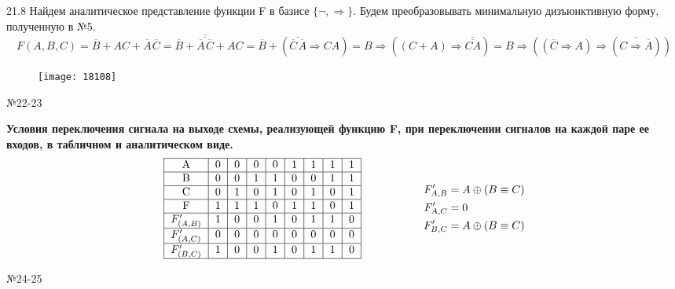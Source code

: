 \documentclass[]{article}
\begin{document}
	21.8 Найдем аналитическое представление функции F в базисе $\{\neg,\Rightarrow\}$.
	Будем преобразовывать минимальную дизъюнктивную форму, полученную в №5.
	\[
		F(A,B,C)=\overline{B} + AC + \overline{A}\hspace{1pt}\overline{C}=
		\overline{B} + \overline{\overline{\overline{A}\hspace{1pt}\overline{C}}}+ AC=
		\overline{B}+(\overline{\overline{C}\hspace{1pt}\overline{A}}\Rightarrow CA)=
		B\Rightarrow((C+A)\Rightarrow \overline{\overline{CA}})=B\Rightarrow((\overline{C}\Rightarrow A)\Rightarrow (\overline{C\Rightarrow\overline{A}}))
	\]
	\begin{figure}[h!]
		\centering
		\texttt{[image: 18108]}
	\end{figure}
	\newpage
	\begin{center}\begin{large}{№22-23}\end{large}\end{center}
	\textbf{Условия переключения сигнала на выходе схемы, реализующей функцию F, при переключении сигналов на каждой паре ее входов, в табличном и аналитическом виде.}
	\[
	\begin{aligned}
	\begin{tabular}{|c|c|c|c|c|c|c|c|c|}
	\hline
	A              & 0 & 0 & 0 & 0 & 1 & 1 & 1 & 1 \\ \hline
	B              & 0 & 0 & 1 & 1 & 0 & 0 & 1 & 1 \\ \hline
	C              & 0 & 1 & 0 & 1 & 0 & 1 & 0 & 1 \\ \hline
	F              & 1 & 1 & 1 & 0 & 1 & 1 & 0 & 1 \\ \hline
	$F'_{(A,B)}$   & 1 & 0 & 0 & 1 & 0 & 1 & 1 & 0 \\ \hline
	$F'_{(A,C)}$   & 0 & 0 & 0 & 0 & 0 & 0 & 0 & 0 \\ \hline
	$F'_{(B,C)}$   & 1 & 0 & 0 & 1 & 0 & 1 & 1 & 0 \\ \hline
	\end{tabular}
	\begin{aligned}
	\hspace{2cm}
	F'_{A,B}&=A\oplus(B\equiv C)\\
	F'_{A,C}&=0\\
	F'_{B,C}&=A\oplus(B\equiv C)\\
	\end{aligned}
	\end{aligned}
	\]
	\begin{center}\begin{large}{№24-25}\end{large}\end{center}
\end{document}
